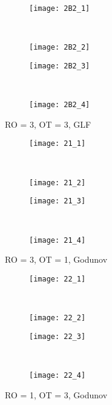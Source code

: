 \documentclass[10pt,letterpaper,fleqn]{article}
\begin{document}
\begin{figure}[h!]
        \centering
        \begin{subfigure}[b]{0.4\textwidth}
                \texttt{[image: 2B2\_1]}
        \end{subfigure}%
        ~ 
        \begin{subfigure}[b]{0.4\textwidth}
                \texttt{[image: 2B2\_2]}
        \end{subfigure}
        
        \begin{subfigure}[b]{0.4\textwidth}
                \texttt{[image: 2B2\_3]}
        \end{subfigure}
        ~
        \begin{subfigure}[b]{0.4\textwidth}
                \texttt{[image: 2B2\_4]}
        \end{subfigure}
        \caption{RO = 3, OT = 3, GLF}
\end{figure}

\begin{figure}[h!]
        \centering
        \begin{subfigure}[b]{0.4\textwidth}
                \texttt{[image: 21\_1]}
        \end{subfigure}%
        ~ 
        \begin{subfigure}[b]{0.4\textwidth}
                \texttt{[image: 21\_2]}
        \end{subfigure}
        
        \begin{subfigure}[b]{0.4\textwidth}
                \texttt{[image: 21\_3]}
        \end{subfigure}
        ~
        \begin{subfigure}[b]{0.4\textwidth}
                \texttt{[image: 21\_4]}
        \end{subfigure}
        \caption{RO = 3, OT = 1, Godunov}
\end{figure}

\begin{figure}[h!]
        \centering
        \begin{subfigure}[b]{0.4\textwidth}
                \texttt{[image: 22\_1]}
        \end{subfigure}%
        ~ 
        \begin{subfigure}[b]{0.4\textwidth}
                \texttt{[image: 22\_2]}
        \end{subfigure}
        
        \begin{subfigure}[b]{0.4\textwidth}
                \texttt{[image: 22\_3]}
        \end{subfigure}
        ~
        \begin{subfigure}[b]{0.4\textwidth}
                \texttt{[image: 22\_4]}
        \end{subfigure}
        \caption{RO = 1, OT = 3, Godunov}
\end{figure}
\end{document}
